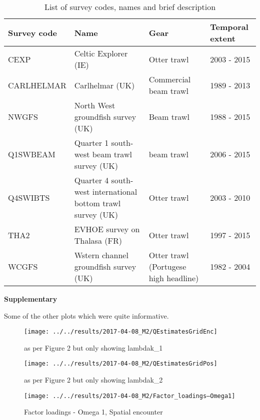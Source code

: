 \documentclass[11pt]{article}
\begin{document}
\newpage

\begin{table}[!ht]
	\caption{List of survey codes, names and brief description}
	\center
	\begin{tabular}{ p{3cm} p{4cm} p{4cm} p{2cm} }
		\hline
		Survey code    & Name 	& Gear & Temporal extent \\
		\hline
		CEXP           & Celtic Explorer (IE)   & Otter trawl & 2003 - 2015 \\
		CARLHELMAR     & Carlhelmar (UK)	& Commercial beam trawl & 1989 - 2013 \\
		NWGFS          & North West groundfish survey (UK) & Beam trawl & 1988 - 2015 \\
		Q1SWBEAM       & Quarter 1 south-west beam trawl survey (UK) 	& beam trawl & 2006 - 2015 \\
		Q4SWIBTS       & Quarter 4 south-west international bottom trawl survey (UK) & Otter trawl & 2003 - 2010 \\
		THA2           & EVHOE survey on Thalasa (FR) & Otter trawl & 1997 - 2015 \\
		WCGFS          & Wstern channel groundfish survey (UK) & Otter
		trawl (Portugese high headline) & 1982 - 2004 \\
		\hline
	\end{tabular}
\end{table}



\newpage

\textbf{Supplementary}

Some of the other plots which were quite informative.

\begin{figure}[!ht]
	\texttt{[image: ../../results/2017-04-08\_M2/QEstimatesGridEnc]}
	\label{fig:Q_square1}
	\caption{as per Figure 2 but only showing lambdak\_1 }
\end{figure}

\begin{figure}[!ht]
	\texttt{[image: ../../results/2017-04-08\_M2/QEstimatesGridPos]}
	\label{fig:Q_square2}
	\caption{as per Figure 2 but only showing lambdak\_2}

\end{figure}


\begin{figure}[!ht]
	\texttt{[image: ../../results/2017-04-08\_M2/Factor\_loadings--Omega1]}
	\label{fig:Fact1}
	\caption{Factor loadings - Omega 1, Spatial encounter}
\end{figure}
\end{document}
